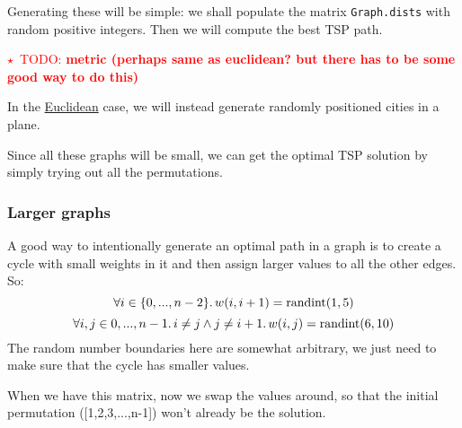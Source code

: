 \documentclass{article}
\newcommand{\todo}[1]{\textcolor{red}{$\star$~TODO: \textbf{#1}}}
\newcommand{\randint}{\operatorname{randint}}
\newcommand{\uu}[1]{\underline{#1}}
\newcommand{\py}[1]{\lstinline[language=Python]{#1}}
\begin{document}
Generating these will be simple: we shall populate the matrix
\py{Graph.dists} with random positive integers. Then we will
compute the best TSP path.

\todo{metric (perhaps same as euclidean? but there has to be some good
way to do this)}

In the \uu{Euclidean} case, we will instead generate randomly positioned
cities in a plane.

Since all these graphs will be small, we can get the optimal TSP solution by
simply trying out all the permutations.

\subsubsection{Larger graphs}

A good way to intentionally generate an optimal path in a graph is to create
a cycle with small weights in it and then assign larger values to all the other
edges. So:
\[ \forall i\in\{0,...,n-2\}\ldotp w(i,i+1)=\randint(1,5) \]
\[ \forall i,j\in{0,...,n-1}\ldotp i\ne j \wedge j\ne i+1 \ldotp
w(i,j) = \randint(6,10) \]
The random number boundaries here are somewhat arbitrary, we just need to make
sure that the cycle has smaller values.

When we have this matrix, now we swap the values around, so that the initial
permutation ([1,2,3,...,n-1]) won't already be the solution.
\end{document}
